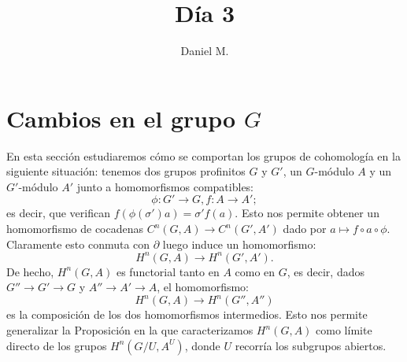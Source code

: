 \documentclass[a4paper,12pt, leqno]{article}
\title{Día 3}
\author{Daniel M.}
\begin{document}
	\section{Cambios en el grupo $G$}
	En esta sección estudiaremos cómo se comportan los grupos de cohomología en la siguiente situación: tenemos dos grupos profinitos $G$ y $G'$, un $G$-módulo $A$ y un $G'$-módulo $A'$ junto a homomorfismos compatibles:
	\begin{equation*}
	\phi: G' \rightarrow G,f:A \rightarrow A';
	\end{equation*}
	es decir, que verifican $f(\phi(\sigma')a)=\sigma' f(a)$. Esto nos permite obtener un homomorfismo de cocadenas $C^n(G,A)\rightarrow C^n(G',A')$ dado por $a \mapsto f \circ a \circ \phi$. Claramente esto conmuta con $\partial$ luego induce un homomorfismo:
	\begin{equation*}
	H^n(G,A) \rightarrow H^n(G',A').
	\end{equation*}
	De hecho, $H^n(G,A)$ es functorial tanto en $A$ como en $G$, es decir, dados $G'' \rightarrow G' \rightarrow G$ y $A'' \rightarrow A' \rightarrow A$, el homomorfismo:
	\begin{equation*}
	H^n(G,A) \rightarrow H^n(G'',A'')
	\end{equation*}	
	es la composición de los dos homomorfismos intermedios. Esto nos permite generalizar la Proposición en la que caracterizamos $H^n(G,A)$ como límite directo de los grupos $H^n(G/U,A^U)$, donde $U$ recorría los subgrupos abiertos.
	
\end{document}
